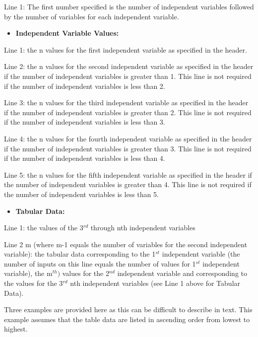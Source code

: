 Line 1: The first number specified is the number of independent variables followed by the number of variables for each independent variable.

\begin{itemize}
\tightlist
\item
  \textbf{Independent Variable Values:}
\end{itemize}

Line 1: the n values for the first independent variable as specified in the header.

Line 2: the n values for the second independent variable as specified in the header if the number of independent variables is greater than 1. This line is not required if the number of independent variables is less than 2.

Line 3: the n values for the third independent variable as specified in the header if the number of independent variables is greater than 2. This line is not required if the number of independent variables is less than 3.

Line 4: the n values for the fourth independent variable as specified in the header if the number of independent variables is greater than 3. This line is not required if the number of independent variables is less than 4.

Line 5: the n values for the fifth independent variable as specified in the header if the number of independent variables is greater than 4. This line is not required if the number of independent variables is less than 5.

\begin{itemize}
\tightlist
\item
  \textbf{Tabular Data:}
\end{itemize}

Line 1: the values of the 3\(^{rd}\) through nth independent variables

Line 2 m (where m-1 equals the number of variables for the second independent variable): the tabular data corresponding to the 1\(^{st}\) independent variable (the number of inputs on this line equals the number of values for 1\(^{st}\) independent variable), the m\(^{th})\) values for the 2\(^{nd}\) independent variable and corresponding to the values for the 3\(^{rd}\) nth independent variables (see Line 1 above for Tabular Data).

Three examples are provided here as this can be difficult to describe in text. This example assumes that the table data are listed in ascending order from lowest to highest.

